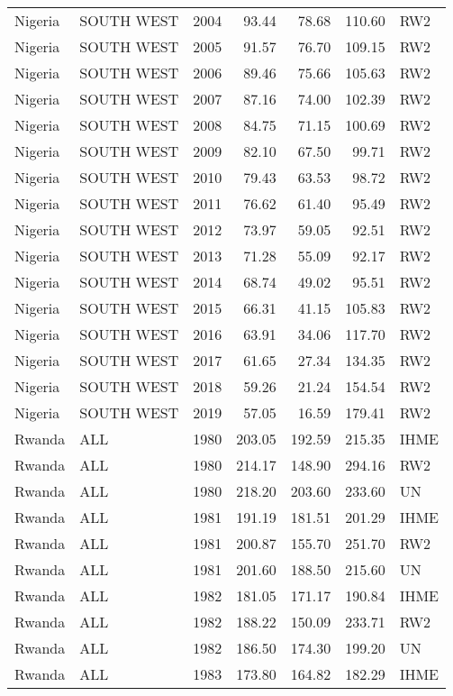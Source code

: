 \begin{longtable}{lllrrrl}
  Nigeria & SOUTH WEST & 2004 & 93.44 & 78.68 & 110.60 & RW2 \\ 
  Nigeria & SOUTH WEST & 2005 & 91.57 & 76.70 & 109.15 & RW2 \\ 
  Nigeria & SOUTH WEST & 2006 & 89.46 & 75.66 & 105.63 & RW2 \\ 
  Nigeria & SOUTH WEST & 2007 & 87.16 & 74.00 & 102.39 & RW2 \\ 
  Nigeria & SOUTH WEST & 2008 & 84.75 & 71.15 & 100.69 & RW2 \\ 
  Nigeria & SOUTH WEST & 2009 & 82.10 & 67.50 & 99.71 & RW2 \\ 
  Nigeria & SOUTH WEST & 2010 & 79.43 & 63.53 & 98.72 & RW2 \\ 
  Nigeria & SOUTH WEST & 2011 & 76.62 & 61.40 & 95.49 & RW2 \\ 
  Nigeria & SOUTH WEST & 2012 & 73.97 & 59.05 & 92.51 & RW2 \\ 
  Nigeria & SOUTH WEST & 2013 & 71.28 & 55.09 & 92.17 & RW2 \\ 
  Nigeria & SOUTH WEST & 2014 & 68.74 & 49.02 & 95.51 & RW2 \\ 
  Nigeria & SOUTH WEST & 2015 & 66.31 & 41.15 & 105.83 & RW2 \\ 
  Nigeria & SOUTH WEST & 2016 & 63.91 & 34.06 & 117.70 & RW2 \\ 
  Nigeria & SOUTH WEST & 2017 & 61.65 & 27.34 & 134.35 & RW2 \\ 
  Nigeria & SOUTH WEST & 2018 & 59.26 & 21.24 & 154.54 & RW2 \\ 
  Nigeria & SOUTH WEST & 2019 & 57.05 & 16.59 & 179.41 & RW2 \\ 
  Rwanda & ALL & 1980 & 203.05 & 192.59 & 215.35 & IHME \\ 
  Rwanda & ALL & 1980 & 214.17 & 148.90 & 294.16 & RW2 \\ 
  Rwanda & ALL & 1980 & 218.20 & 203.60 & 233.60 & UN \\ 
  Rwanda & ALL & 1981 & 191.19 & 181.51 & 201.29 & IHME \\ 
  Rwanda & ALL & 1981 & 200.87 & 155.70 & 251.70 & RW2 \\ 
  Rwanda & ALL & 1981 & 201.60 & 188.50 & 215.60 & UN \\ 
  Rwanda & ALL & 1982 & 181.05 & 171.17 & 190.84 & IHME \\ 
  Rwanda & ALL & 1982 & 188.22 & 150.09 & 233.71 & RW2 \\ 
  Rwanda & ALL & 1982 & 186.50 & 174.30 & 199.20 & UN \\ 
  Rwanda & ALL & 1983 & 173.80 & 164.82 & 182.29 & IHME \\ 

\end{longtable}

